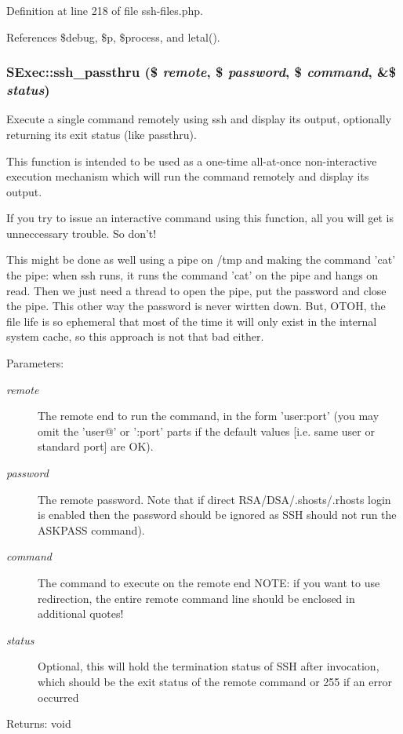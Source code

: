 Definition at line 218 of file ssh-files.php.

References \$debug, \$p, \$process, and letal().
\subsubsection{\setlength{\rightskip}{0pt plus 5cm}SExec::ssh\_\-passthru (\$ {\em remote}, \$ {\em password}, \$ {\em command}, \&\$ {\em status})}\label{classSExec_a13}


Execute a single command remotely using ssh and display its output, optionally returning its exit status (like passthru). 

This function is intended to be used as a one-time all-at-once non-interactive execution mechanism which will run the command remotely and display its output.

If you try to issue an interactive command using this function, all you will get is unneccessary trouble. So don't!

This might be done as well using a pipe on /tmp and making the command 'cat' the pipe: when ssh runs, it runs the command 'cat' on the pipe and hangs on read. Then we just need a thread to open the pipe, put the password and close the pipe. This other way the password is never wirtten down. But, OTOH, the file life is so ephemeral that most of the time it will only exist in the internal system cache, so this approach is not that bad either.

\begin{Desc}
\item[Parameters:]
\begin{description}
\item[{\em remote}]The remote end to run the command, in the form 'user:port' (you may omit the 'user@' or ':port' parts if the default values [i.e. same user or standard port] are OK). \item[{\em password}]The remote password. Note that if direct RSA/DSA/.shosts/.rhosts login is enabled then the password should be ignored as SSH should not run the ASKPASS command). \item[{\em command}]The command to execute on the remote end NOTE: if you want to use redirection, the entire remote command line should be enclosed in additional quotes! \item[{\em status}]Optional, this will hold the termination status of SSH after invocation, which should be the exit status of the remote command or 255 if an error occurred \end{description}
\end{Desc}
\begin{Desc}
\item[Returns:]void \end{Desc}


